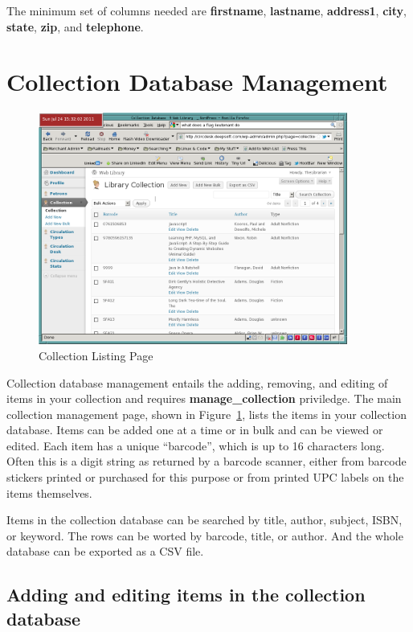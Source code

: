 \documentclass[letterpaper,twoside]{article}
\begin{document}
The minimum set of columns needed are \textbf{firstname},
\textbf{lastname}, \textbf{address1}, \textbf{city}, \textbf{state},
\textbf{zip}, and \textbf{telephone}.

\section{Collection Database Management}

\begin{figure}[htbp]
\begin{centering}
\includegraphics[width=4in]{ColectionListing.png}
\caption{Collection Listing Page}
\label{fig:CollectionList}
\end{centering}
\end{figure}
Collection database management entails the adding, removing, and
editing of items in your collection and requires
\textbf{manage\_collection} priviledge.  The main collection management
page, shown in Figure~\ref{fig:CollectionList}, lists the items in your
collection database. Items can be added one at a time or in bulk and
can be viewed or edited.  Each item has a unique ``barcode'', which is
up to 16 characters long.  Often this is a digit string as returned by
a barcode scanner, either from barcode stickers printed or purchased
for this purpose or from printed UPC labels on the items themselves.

Items in the collection database can be searched by title, author,
subject, ISBN, or keyword.  The rows can be worted by barcode, title, or
author. And the whole database can be exported as a CSV file.

\subsection{Adding and editing items in the collection database}
\end{document}
